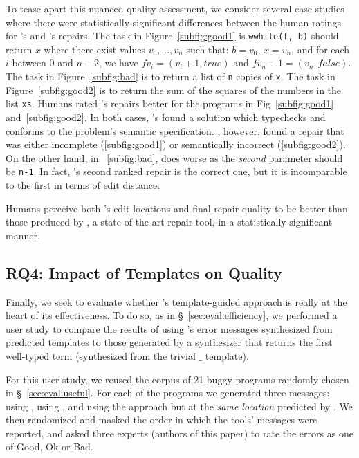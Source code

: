 %
To tease apart this nuanced quality assessment,
we consider several case studies where there were
statistically-significant differences between
the human ratings for \toolname's and \seminal's
repairs.
%
The task in Figure~\ref{subfig:good1} is
\texttt{wwhile(f, b)} should return $x$ where
there exist values $v_0,...,v_n$ such that:
$b = v_0$, $x = v_n$, and for each $i$ between
0 and $n-2$, we have $f v_i = (v_i+1, true)$
and $f v_n-1 = (v_n, false)$.
%
The task in Figure~\ref{subfig:bad} is to
return a list of \texttt{n} copies of \texttt{x}.
%
The task in Figure~\ref{subfig:good2} is to
return the sum of the squares of the numbers
in the list \texttt{xs}.
%
Humans rated \toolname's repairs better
for the programs in Fig~\ref{subfig:good1}
and~\ref{subfig:good2}.
%
In both cases, \toolname's found a solution
which typechecks and conforms to the problem's
semantic specification.
%
\seminal, however, found a repair that was
either incomplete (\ref{subfig:good1}) or
semantically incorrect (\ref{subfig:good2}).
On the other hand, in ~\ref{subfig:bad}, \toolname
does worse as the \emph{second} parameter should
be \verb|n-1|. In fact, \toolname's second ranked
repair is the correct one, but it is incomparable
to the first in terms of edit distance. 

\begin{framed}
\noindent Humans perceive both \toolname's edit locations
 and final repair quality to be better than those produced
 by \seminal, a state-of-the-art \ocaml repair tool, in a
 statistically-significant manner.
\end{framed}

\subsection{RQ4: Impact of Templates on Quality}

Finally, we seek to evaluate whether \toolname's template-guided
approach is really at the heart of its effectiveness. To do so,
as in \S~\ref{sec:eval:efficiency}, we performed a user study
to compare the results of using \toolname's error messages
synthesized from predicted templates to those generated by
a \naive synthesizer that returns the first well-typed term
(\ie synthesized from the trivial $\_$ template).

%
For this user study, we reused the corpus of 21 buggy programs
randomly chosen in \S~\ref{sec:eval:useful}. For each of the
programs we generated three messages: using \toolname, using \seminal,
and using the \naive approach but at the \emph{same location} predicted
by \toolname. We then randomized and masked the order in which the tools'
messages were reported, and asked three experts (authors of this paper)
to rate the errors as one of Good, Ok or Bad.

